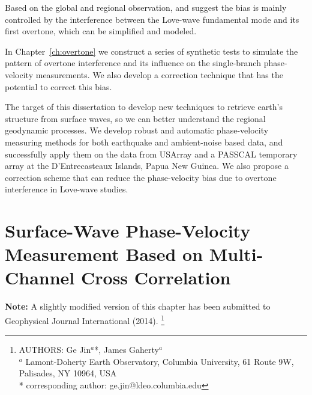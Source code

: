 \documentclass[12pt,oneside]{book}
\begin{document}
Based on the global and regional observation, \citet{Nettles:2011bb} and \citet{Foster:2014kr} suggest the bias is mainly controlled by the interference between the Love-wave fundamental mode and its first overtone, which can be simplified and modeled.

In Chapter~\ref{ch:overtone} we construct a series of synthetic tests to simulate the pattern of overtone interference and its influence on the single-branch phase-velocity measurements. We also develop a correction technique that has the potential to correct this bias.

The target of this dissertation to develop new techniques to retrieve earth's structure from surface waves, so we can better understand the regional geodynamic processes. We develop robust and automatic phase-velocity measuring methods for both earthquake and ambient-noise based data, and successfully apply them on the data from USArray and a PASSCAL temporary array at the D'Entrecasteaux Islands, Papua New Guinea. We also propose a correction scheme that can reduce the phase-velocity bias due to overtone interference in Love-wave studies.

\raggedbottom
\pagebreak

\singlespacing
\chapter[Surface-Wave Measurement Based on Cross Correlation]{Surface-Wave Phase-Velocity Measurement Based on Multi-Channel Cross Correlation}
\label{ch:aswms}
\doublespacing

\thispagestyle{fancy}

\begin{raggedright}
{\bf Note: } A slightly modified version of this chapter has been submitted to Geophysical Journal International (2014).
\footnote{AUTHORS:  Ge Jin$^a$*,  James Gaherty$^a$\\
$^a$ Lamont-Doherty Earth Observatory, Columbia University, 61 Route 9W, Palisades, NY 10964, USA\\
* corresponding author: ge.jin@ldeo.columbia.edu}
\end{raggedright}
\normalsize

\end{document}
